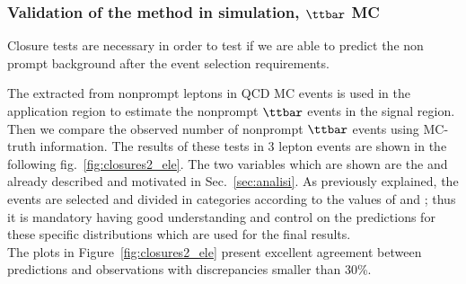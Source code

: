 \subsubsection{Validation of the \ttol method in simulation, $\ttbar$ MC }
Closure tests are necessary in order to test if we are able to predict
the non prompt background after the event selection requirements.

The \fr extracted from nonprompt leptons in QCD MC events is
used in the application region to estimate the nonprompt $\ttbar$
events in the signal region. Then we compare the observed number of
nonprompt $\ttbar$ events using MC-truth information. The results of
these tests in 3 lepton events are shown in the following
fig.~\ref{fig:closures2_ele}. The two variables which are shown are
the \mmin and \mlll already described and motivated in
Sec.~\ref{sec:analisi}.
As previously explained, the events are selected and divided in
categories according to the values of \mmin and \mlll; thus it is
mandatory having good understanding and control on the predictions for
these specific distributions which are used for the final results. \\
The plots in Figure~\ref{fig:closures2_ele} present excellent
agreement between predictions and observations with discrepancies 
smaller than 30\%.


